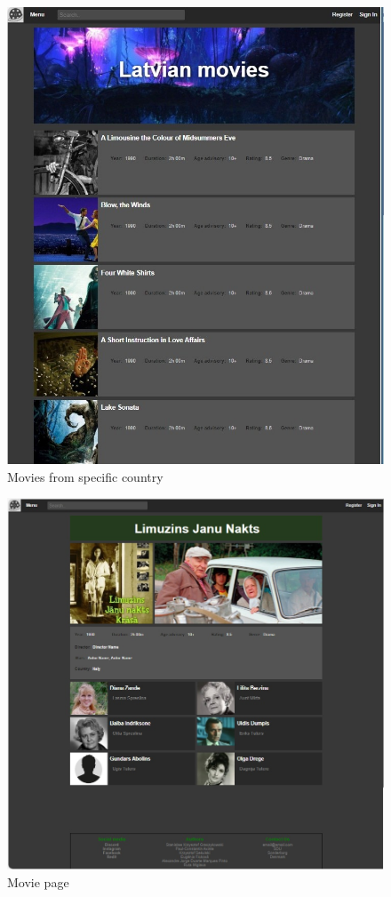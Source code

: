 \documentclass[letterpaper,twocolumn]{article}
\begin{document}
\clearpage
\begin{figure}[h!]
\centering
\includegraphics[scale=1]{images/Full_list_of_country.jpg}
\caption{Movies from specific country}
\label{countrypage}
\end{figure}

\clearpage
\begin{figure}[h!]
\centering
\includegraphics[scale=0.8]{images/Movie.jpg} 
\caption{Movie page}
\label{Moviepage}
\end{figure}
\end{document}
